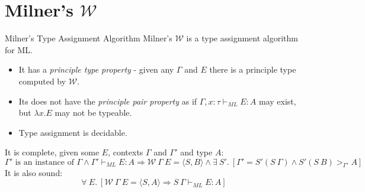 \section{Milner's $\mathcal{W}$}
\begin{definitionbox}{Milner's Type Assignment Algorithm}
    Milner's $\mathcal{W}$ is a type assignment algorithm for ML.
    \begin{itemize}
        \item It has a \textit{principle type property} - given any $\Gamma$ and $E$ there is a principle type computed by $\mathcal{W}$.
        \item Its does not have the \textit{principle pair property} as if $\Gamma, x:\tau \vdash_{ML} E : A$ may exist, but $\lambda x. E$ may not be typeable.
        \item Type assignment is decidable.
    \end{itemize}
    It is complete, given some $E$, contexts $\Gamma$ and $\Gamma'$ and type $A$:
    \[\Gamma' \text{ is an instance of } \Gamma \land \Gamma' \vdash_{ML} E : A \Rightarrow \mathcal{W} \ \Gamma \ E = \langle S, B \rangle \land \exists \ S' . \ [\Gamma' = S' (S \ \Gamma) \land S' (S \ B) >_{\Gamma'} A]\]
    It is also sound:
    \[\forall \ E . \ [\mathcal{W} \ \Gamma \ E = \langle S, A \rangle \Rightarrow S \ \Gamma \vdash_{ML} E : A]\]
\end{definitionbox}

